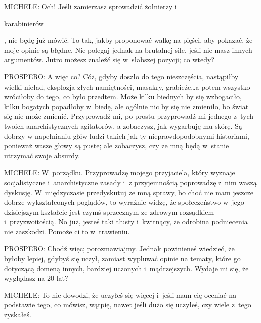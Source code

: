 \documentclass[oneside,polish,11pt,sfheadings]{mwbk}
\begin{document}
 
\noindent MICHELE: Och! Jeśli zamierzasz sprowadzić żołnierzy i~\begin{itshape}karabinierów \end{itshape}, nie będę już mówić. To tak, jakby proponować walkę
na pięści, aby pokazać, że moje opinie są błędne. Nie polegaj jednak na brutalnej sile, jeśli nie masz innych
argumentów. Jutro możesz znaleźć się w~słabszej pozycji; co wtedy? 




 
\noindent PROSPERO: A więc co? Cóż, gdyby doszło do tego nieszczęścia, nastąpiłby wielki nieład, eksplozja złych namiętności,
masakry, grabieże\ldots a potem wszystko wróciłoby do tego, co było przedtem. Może kilku biednych by się wzbogaciło, kilku
bogatych popadłoby w~biedę, ale ogólnie nic by się nie zmieniło, bo świat się nie może zmienić. Przyprowadź mi, po
prostu przyprowadź mi jednego z~tych twoich anarchistycznych agitatorów, a zobaczysz, jak wygarbuję mu skórę. Są dobrzy
w napełnianiu głów ludzi takich jak ty nieprawdopodobnymi historiami, ponieważ wasze głowy są puste; ale zobaczysz, czy
ze mną będą w~stanie utrzymać swoje absurdy. 




 
\noindent MICHELE: W~porządku. Przyprowadzę mojego przyjaciela, który wyznaje socjalistyczne i~anarchistyczne zasady i~z
przyjemnością poprowadzę z~nim waszą dyskusję. W~międzyczasie przedyskutuj ze mną sprawy, bo choć nie mam jeszcze
dobrze wykształconych poglądów, to wyraźnie widzę, że społeczeństwo w~jego dzisiejszym kształcie jest czymś sprzecznym
ze zdrowym rozsądkiem i~przyzwoitością. No już, jesteś taki tłusty i~kwitnący, że odrobina podniecenia nie zaszkodzi.
Pomoże ci to w~trawieniu. 




 
\noindent PROSPERO: Chodź więc; porozmawiajmy. Jednak powinieneś wiedzieć, że byłoby lepiej, gdybyś się uczył, zamiast wypluwać
opinie na tematy, które go dotyczącą domeną innych, bardziej uczonych i~mądrzejszych. Wydaje mi się, że wyglądasz na 20
lat? 




 
\noindent MICHELE: To nie dowodzi, że uczyłeś się więcej i~jeśli mam cię oceniać na podstawie tego, co mówisz, wątpię, nawet jeśli
dużo się uczyłeś, czy wiele z~tego zyskałeś. 
\end{document}
